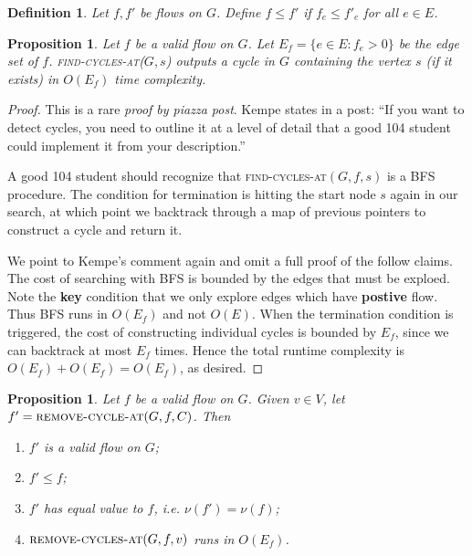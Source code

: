 \documentclass[10pt]{article}
\newtheorem{proposition}[lemma]{Proposition}
\newtheorem{definition}{Definition}
\begin{document}
\begin{definition}
  Let \(f, f'\) be flows on \(G\). Define \(f \leq f'\) if \(f_e \leq f'_e\) for all \(e \in E\). 
\end{definition}

\begin{proposition}
  Let \(f\) be a valid flow on \(G\). Let \(E_f = \{e \in E : f_e > 0\}\) be the edge set of \(f\). \textsc{find-cycles-at}(\(G, s\)) outputs a cycle in \(G\) containing the vertex \(s\) (if it exists) in \(O(E_f)\) time complexity.
\end{proposition}

\begin{proof}
  This is a rare \textit{proof by piazza post}. Kempe states in a post: ``If you want to detect cycles, you need to outline it at a level of detail that a good 104 student could implement it from your description.''

  A good 104 student should recognize that \textsc{find-cycles-at}\((G, f, s)\) is a BFS procedure. The condition for termination is hitting the start node \(s\) again in our search, at which point we backtrack through a map of previous pointers to construct a cycle and return it.

  We point to Kempe's comment again and omit a full proof of the follow claims. The cost of searching with BFS is bounded by the edges that must be exploed. Note the \textbf{key} condition that we only explore edges which have \textbf{postive} flow. Thus BFS runs in \(O(E_f)\) and not \(O(E)\). When the termination condition is triggered, the cost of constructing individual cycles is bounded by \(E_f\), since we can backtrack at most \(E_f\) times. Hence the total runtime complexity is \(O(E_f) + O(E_f) = O(E_f)\), as desired.
\end{proof}

\begin{proposition}
  Let \(f\) be a valid flow on \(G\). Given \(v \in V\), let \(f' = \textsc{remove-cycle-at}(G, f, C)\).
  Then 
  \begin{enumerate}
    \item \(f'\) is a valid flow on \(G\);
    \item \(f' \le f\);
    \item \(f'\) has equal value to \(f\), i.e. \(\nu(f') = \nu(f)\);
    \item \(\textsc{remove-cycles-at}(G, f, v)\) runs in \(O(E_f)\).
  \end{enumerate}
\end{proposition}
\end{document}
